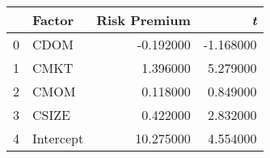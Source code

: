\begin{tabular}{llrr}
\toprule
 & Factor & Risk Premium & \emph{t} \\
\midrule
0 & CDOM & -0.192000 & -1.168000 \\
1 & CMKT & 1.396000 & 5.279000 \\
2 & CMOM & 0.118000 & 0.849000 \\
3 & CSIZE & 0.422000 & 2.832000 \\
4 & Intercept & 10.275000 & 4.554000 \\
\bottomrule
\end{tabular}
